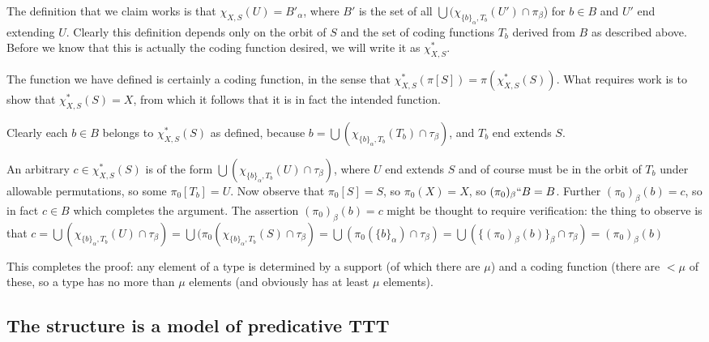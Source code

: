 \documentclass[112pt]{article}
\begin{document}
\begin{description}
The definition that we claim works is that $\chi_{X,S}(U) = B'_\alpha$, where $B'$ is the set of all $\bigcup (\chi_{\{b\}_\alpha,T_b}(U')\cap \pi_\beta$) for $b \in B$ and $U'$ end extending $U$.  Clearly this definition depends only on the orbit of $S$ and the set of coding functions $T_b$ derived from $B$ as described above.  Before we know that this is actually the coding function desired, we will write it as $\chi_{X,S}^*$.

The function we have defined is certainly a coding function, in the sense that $\chi_{X,S}^*(\pi[S]) = \pi(\chi_{X,S}^*(S))$.  What requires work is to show that
$\chi_{X,S}^*(S)=X$, from which it follows that it is in fact the intended function.

Clearly each $b \in B$ belongs to $\chi^*_{X,S}(S)$ as defined, because $b = \bigcup (\chi_{\{b\}_\alpha,T_b}(T_b)\cap \tau_{\beta})$, and $T_b$ end extends $S$.

An arbitrary $c \in \chi_{X,S}^*(S)$ is of the form $\bigcup (\chi_{\{b\}_\alpha,T_b}(U)\cap \tau_{\beta})$, where $U$ end extends $S$ and of course must be in the orbit of $T_b$ under allowable permutations, so some $\pi_0[T_b] = U$. Now observe that $\pi_0[S]=S$, so $\pi_0(X)=X$, so
$(\pi_0)_\beta``B=B$.  Further $(\pi_0)_\beta(b) = c$, so in fact $c \in B$ which completes the argument.  The assertion $(\pi_0)_\beta(b) = c$ might be thought to require verification:   the thing to observe is that $c=\bigcup (\chi_{\{b\}_\alpha,T_b}(U) \cap \tau_\beta)=\bigcup(\pi_0(\chi_{\{b\}_\alpha,T_b}(S)\cap \tau_\beta)=
\bigcup (\pi_0(\{b\}_\alpha)\cap \tau_\beta) =\bigcup(\{(\pi_0)_\beta(b)\}_\beta \cap \tau_\beta) = (\pi_0)_\beta(b)$


\end{description}

This completes the proof:  any element of a type is determined by a support (of which there are $\mu$) and a coding function (there are $<\mu$ of these, so a type has no more than $\mu$ elements (and obviously has at least $\mu$ elements).

\begin{comment}
{\bf Note for the formal verification project:}  I think the latest revisions are closer to the standard needed for the Lean verification project.
\end{comment}

\newpage
\subsection{The structure is a model of predicative TTT}
\end{document}
